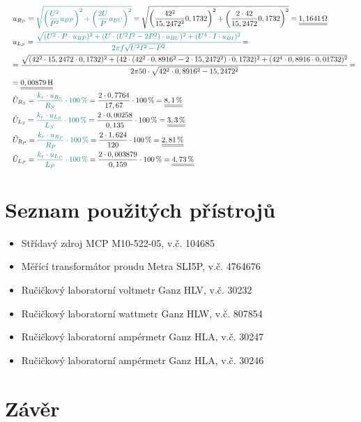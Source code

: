 \documentclass[a4paper, czech]{article}
\begin{document}
\begin{enumerate}
\begin{multline*}
        \ \ \ u_{R_P} = \textcolor{teal}{\sqrt{\left(\frac{U^2}{P^2}u_{BP}\right)^2 + \left(\frac{2U}{P}u_{BU}\right)^2}} = \sqrt{\left(\frac{42^2}{15,2472^2}0,1732\right)^2 + \left(\frac{2 \cdot 42}{15,2472}0,1732\right)^2} = \underline{\underline{1,1641\,\Omega}} \hfill \\
        \ \ \ u_{L_P} = \textcolor{teal}{\cfrac{\sqrt{(U^2 \cdot P \cdot u_{BP})^2 + (U \cdot (U^2I^2 - 2P^2) \cdot u_{BU})^2 + (U^4\cdot I \cdot u_{BI})^2}}{2 \pi f \sqrt{U^2I^2-P^2}}} = \hfill \\
        \ \ \ = \cfrac{\sqrt{(42^2 \cdot 15,2472 \cdot 0,1732)^2 + (42 \cdot (42^2 \cdot 0,8916^2 - 2 \cdot 15,2472^2) \cdot 0,1732)^2 + (42^4\cdot 0,8916 \cdot 0,01732)^2}}{2 \pi 50 \cdot \sqrt{42^2 \cdot 0,8916^2-15,2472^2}} = \hfill \\
        \ \ \ = \underline{\underline{0,00879\,\text{H}}} \hfill \\
        \ \ \ \tilde{U}_{R_S} = \textcolor{teal}{\frac{k_r \cdot u_{R_S}}{R_S} \cdot 100\,\%} = \frac{2 \cdot 0,7764}{17,67} \cdot 100\,\% = \underline{\underline{8,1\,\%}} \hfill \\
        \ \ \ \tilde{U}_{L_S} = \textcolor{teal}{\frac{k_r \cdot u_{L_S}}{L_S} \cdot 100\,\%} = \frac{2 \cdot 0,00258}{0,135} \cdot 100\,\% = \underline{\underline{3,3\,\%}} \hfill \\
        \ \ \ \tilde{U}_{R_P} = \textcolor{teal}{\frac{k_r \cdot u_{R_P}}{R_P} \cdot 100\,\%} = \frac{2 \cdot 1,624}{120} \cdot 100\,\% = \underline{\underline{2,81\,\%}} \hfill \\
        \ \ \ \tilde{U}_{L_P} = \textcolor{teal}{\frac{k_r \cdot u_{L_P}}{L_P} \cdot 100\,\%} = \frac{2 \cdot 0,003879}{0,159} \cdot 100\,\% = \underline{\underline{4,73\,\%}} \hfill
    \end{multline*}
\end{enumerate}

\section{Seznam použitých přístrojů}

\begin{itemize}
    \item Střídavý zdroj MCP M10-522-05, v.č. 104685
    \item Měřící transformátor proudu Metra SLI5P, v.č. 4764676
    \item Ručičkový laboratorní voltmetr Ganz HLV, v.č. 30232
    \item Ručičkový laboratorní wattmetr Ganz HLW, v.č. 807854
    \item Ručičkový laboratorní ampérmetr Ganz HLA, v.č. 30247
    \item Ručičkový laboratorní ampérmetr Ganz HLA, v.č. 30246
\end{itemize}

\section{Závěr}
\end{document}

